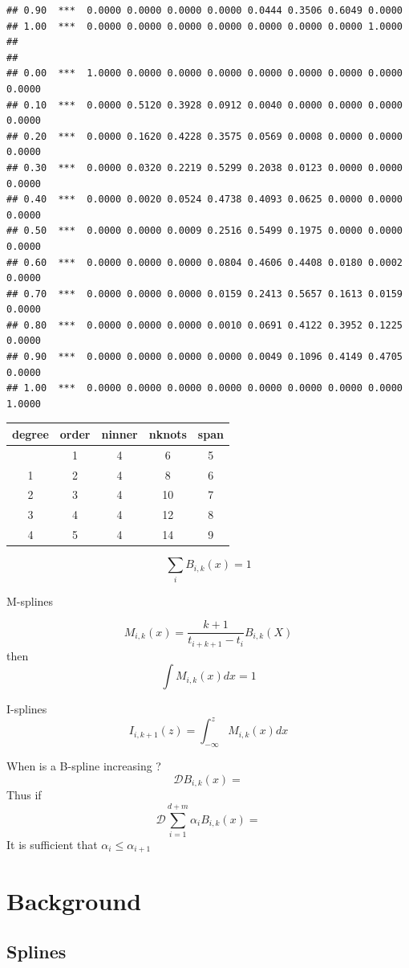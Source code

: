 \documentclass[
  12pt,
]{article}
\begin{document}
\begin{verbatim}
## 0.90  ***  0.0000 0.0000 0.0000 0.0000 0.0444 0.3506 0.6049 0.0000 
## 1.00  ***  0.0000 0.0000 0.0000 0.0000 0.0000 0.0000 0.0000 1.0000 
## 
## 
## 0.00  ***  1.0000 0.0000 0.0000 0.0000 0.0000 0.0000 0.0000 0.0000 0.0000 
## 0.10  ***  0.0000 0.5120 0.3928 0.0912 0.0040 0.0000 0.0000 0.0000 0.0000 
## 0.20  ***  0.0000 0.1620 0.4228 0.3575 0.0569 0.0008 0.0000 0.0000 0.0000 
## 0.30  ***  0.0000 0.0320 0.2219 0.5299 0.2038 0.0123 0.0000 0.0000 0.0000 
## 0.40  ***  0.0000 0.0020 0.0524 0.4738 0.4093 0.0625 0.0000 0.0000 0.0000 
## 0.50  ***  0.0000 0.0000 0.0009 0.2516 0.5499 0.1975 0.0000 0.0000 0.0000 
## 0.60  ***  0.0000 0.0000 0.0000 0.0804 0.4606 0.4408 0.0180 0.0002 0.0000 
## 0.70  ***  0.0000 0.0000 0.0000 0.0159 0.2413 0.5657 0.1613 0.0159 0.0000 
## 0.80  ***  0.0000 0.0000 0.0000 0.0010 0.0691 0.4122 0.3952 0.1225 0.0000 
## 0.90  ***  0.0000 0.0000 0.0000 0.0000 0.0049 0.1096 0.4149 0.4705 0.0000 
## 1.00  ***  0.0000 0.0000 0.0000 0.0000 0.0000 0.0000 0.0000 0.0000 1.0000
\end{verbatim}

\begin{longtable}[]{@{}ccccc@{}}
\toprule\noalign{}
degree & order & ninner & nknots & span \\
\midrule\noalign{}
\endhead
\bottomrule\noalign{}
\endlastfoot
0 & 1 & 4 & 6 & 5 \\
1 & 2 & 4 & 8 & 6 \\
2 & 3 & 4 & 10 & 7 \\
3 & 4 & 4 & 12 & 8 \\
4 & 5 & 4 & 14 & 9 \\
\end{longtable}

\[
\sum_i B_{i,k}(x)=1
\]

M-splines

\[
M_{i,k}(x)=\frac{k+1}{t_{i+k+1}-t_i}B_{i,k}(X)
\]
then
\[
\int M_{i,k}(x)dx=1
\]

I-splines
\[
I_{i,k+1}(z)=\int_{-\infty}^zM_{i,k}(x)dx
\]

When is a B-spline increasing ?
\[
\mathcal{D}B_{i,k}(x)=
\]
Thus if
\[
\mathcal{D}\sum_{i=1}^{d+m}\alpha_iB_{i,k}(x)=
\]
It is sufficient that \(\alpha_i\leq\alpha_{i+1}\)

\section{Background}\label{background}

\subsection{Splines}\label{splines}
\end{document}
